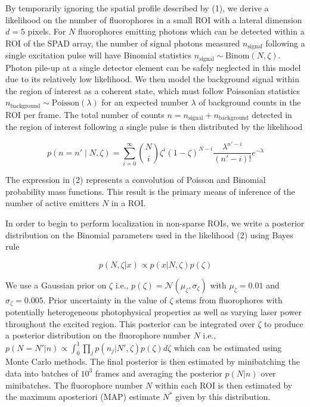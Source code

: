 By temporarily ignoring the spatial profile described by (1), we derive a likelihood on the number of fluorophores in a small ROI with a lateral dimension $d = 5$ pixels. For $N$ fluorophores emitting photons which can be detected within a ROI of the SPAD array, the number of signal photons measured $n_{\mathrm{signal}}$ following a single excitation pulse will have Binomial statistics $n_{\mathrm{signal}} \sim \mathrm{Binom}(N,\zeta)$. Photon pile-up at a single detector element can be safely neglected in this model due to its relatively low likelihood. We then model the background signal within the region of interest as a coherent state, which must follow Poissonian statistics $n_{\mathrm{background}} \sim \mathrm{Poisson}(\lambda)$ for an expected number $\lambda$ of background counts in the ROI per frame. The total number of counts $n=n_{\mathrm{signal}}+n_{\mathrm{background}}$ detected in the region of interest following a single pulse is then distributed by the likelihood

\begin{equation}
p(n=n' \mid N, \zeta) = \sum_{i=0}^{\infty} \binom{N}{i} \zeta^i (1-\zeta)^{N-i} \frac{\lambda^{n'-i}}{(n'-i)!} e^{-\lambda}
\end{equation}

The expression in (2) represents a convolution of Poisson and Binomial probability mass functions. This result is the primary means of inference of the number of active emitters $N$ in a ROI.

In order to begin to perform localization in non-sparse ROIs, we write a posterior distribution on the Binomial parameters used in the likelihood (2) using Bayes rule

\begin{equation}
p(N,\zeta\lvert x) \propto p(x\lvert N,\zeta)p(\zeta)
\end{equation}

We use a Gaussian prior on $\zeta$ i.e., $p(\zeta) = \mathcal{N}(\mu_{\zeta},\sigma_{\zeta})$ with $\mu_{\zeta}=0.01$ and $\sigma_{\zeta}=0.005$. Prior uncertainty in the value of $\zeta$ stems from fluorophores with potentially heterogeneous photophysical properties as well as varying laser power throughout the excited region. This posterior can be integrated over $\zeta$ to produce a posterior distribution on the fluorophore number $N$ i.e., $p(N=N'\lvert n) \propto \int_{0}^{1} \prod_{j} p(n_{j}\lvert N',\zeta)p(\zeta) d\zeta$ which can be estimated using Monte Carlo methods. The final posterior is then estimated by minibatching the data into batches of $10^3$ frames and averaging the posterior $p(N\lvert n)$ over minibatches. The fluorophore number $N$ within each ROI is then estimated by the maximum aposteriori (MAP) estimate $N^{*}$ given by this distribution.

